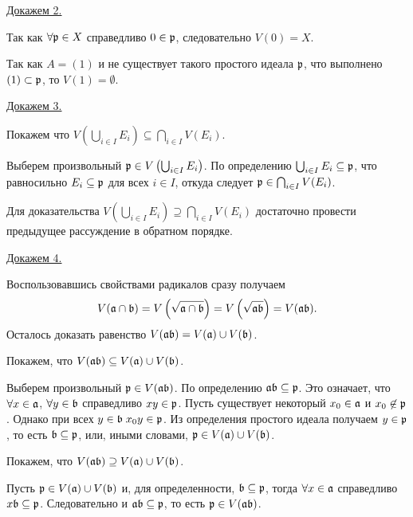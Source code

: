     \underline{Докажем 2.}
    \begin{Proof}

        Так как $\forall \mathfrak{p} \in X$ справедливо $0 \in \mathfrak{p}$, следовательно $V(0) = X$.

        Так как $A = (1)$ и не существует такого простого идеала $\mathfrak{p}$, что выполнено $(1) \subset \mathfrak{p}$, то $V(1) = \emptyset$.
    \end{Proof}
    \underline{Докажем 3.}
    \begin{Proof}
        
        Покажем что $V\left(\bigcup_{i \in I} E_i\right) \subseteq \bigcap_{i \in I} V(E_i)$.

        Выберем произвольный $\mathfrak{p} \in V\left(\bigcup_{i \in I} E_i\right)$. По определению $\bigcup_{i \in I} E_i \subseteq \mathfrak{p}$, что равносильно 
        $E_i \subseteq \mathfrak{p}$ для всех $i \in I$, откуда следует $\mathfrak{p} \in \bigcap_{i \in I} V(E_i)$.

        Для доказательства $V\left(\bigcup_{i \in I} E_i\right) \supseteq \bigcap_{i \in I} V(E_i)$ достаточно провести предыдущее рассуждение в обратном порядке.
    \end{Proof}
    \underline{Докажем 4.}
    \begin{Proof}
        
        Воспользовавшись свойствами радикалов сразу получаем
        $$
            V(\mathfrak{a} \cap \mathfrak{b}) = V\left(\sqrt{\mathfrak{a} \cap \mathfrak{b}}\right) = V\left(\sqrt{\mathfrak{ab}}\right) = V(\mathfrak{ab}).
        $$
        Осталось доказать равенство $V(\mathfrak{ab}) = V(\mathfrak{a}) \cup V(\mathfrak{b})$.

        Покажем, что $V(\mathfrak{ab}) \subseteq V(\mathfrak{a}) \cup V(\mathfrak{b})$.

        Выберем произвольный $\mathfrak{p} \in V(\mathfrak{ab})$. По определению $\mathfrak{ab} \subseteq \mathfrak{p}$. Это означает, что $\forall x \in \mathfrak{a}$, $\forall y \in \mathfrak{b}$
        справедливо $xy \in \mathfrak{p}$. Пусть существует некоторый $x_0 \in \mathfrak{a}$ и $x_0 \not \in \mathfrak{p}$. Однако при всех $y \in \mathfrak{b}\;x_0y \in \mathfrak{p}$.
        Из определения простого идеала получаем $y \in \mathfrak{p}$, то есть $\mathfrak{b} \subseteq \mathfrak{p}$, или, иными словами, $\mathfrak{p} \in V(\mathfrak{a}) \cup V(\mathfrak{b})$.

        Покажем, что $V(\mathfrak{ab}) \supseteq V(\mathfrak{a}) \cup V(\mathfrak{b})$.

        Пусть $\mathfrak{p} \in V(\mathfrak{a}) \cup V(\mathfrak{b})$ и, для определенности, $\mathfrak{b} \subseteq \mathfrak{p}$, тогда $\forall x \in \mathfrak{a}$ справедливо $x\mathfrak{b} \subseteq \mathfrak{p}$. Следовательно 
        и $\mathfrak{ab} \subseteq \mathfrak{p}$, то есть $\mathfrak{p} \in V(\mathfrak{ab})$.
    \end{Proof}

